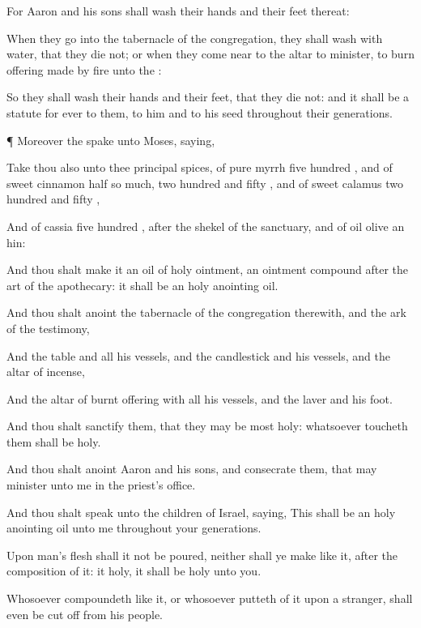 {For
Aaron and his
sons shall
wash their
hands and their
feet thereat:

When they
go into the
tabernacle of the
congregation, they shall
wash with
water, that they
die not; or when they come
near to the
altar to
minister, to burn
offering made by
fire unto the
{}:

So they shall
wash their
hands and their
feet, that they
die not: and it shall be a
statute for
ever to them,
{} to him and to his
seed throughout their
generations.


\par }{\PP {}¶ Moreover the
{}
spake unto
Moses,
saying,

Take thou also unto thee
principal
spices, of
pure
myrrh
five
hundred
{}, and of
sweet
cinnamon
half so
much,
{} two
hundred and
fifty
{}, and of
sweet
calamus two
hundred and
fifty
{},

And of
cassia
five
hundred
{}, after the
shekel of the
sanctuary, and of
oil
olive an
hin:

And thou shalt
make it an
oil of
holy
ointment, an
ointment
compound after the
art of the
apothecary: it shall be an
holy
anointing
oil.

And thou shalt
anoint the
tabernacle of the
congregation therewith, and the
ark of the
testimony,

And the
table and all his
vessels, and the
candlestick and his
vessels, and the
altar of
incense,

And the
altar of burnt
offering with all his
vessels, and the
laver and his
foot.

And thou shalt
sanctify them, that they may be
most
holy: whatsoever
toucheth them shall be
holy.

And thou shalt
anoint
Aaron and his
sons, and
consecrate them, that
{} may minister unto me in the
priest’s office.

And thou shalt
speak unto the
children of
Israel,
saying, This shall be an
holy
anointing
oil unto me throughout your
generations.

Upon
man’s
flesh shall it not be
poured, neither shall ye
make
{} like it, after the
composition of it: it
{}
holy,
{} it shall be
holy unto you.

Whosoever
compoundeth
{} like it, or whosoever
putteth
{} of it upon a
stranger, shall even be
cut off from his
people.


}
